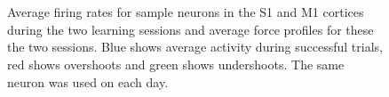 \documentclass[11pt,a4paper]{article}
\begin{document}
\begin{figure}[h]
        \\ \\
        \noindent{}
        \caption{Average firing rates for sample neurons in the S1 and M1 cortices during the two learning sessions and average force profiles for these the two sessions. Blue shows average activity during successful trials, red shows overshoots and green shows undershoots. The same neuron was used on each day.}\label{fig:samples}
\end{figure}
\end{document}

